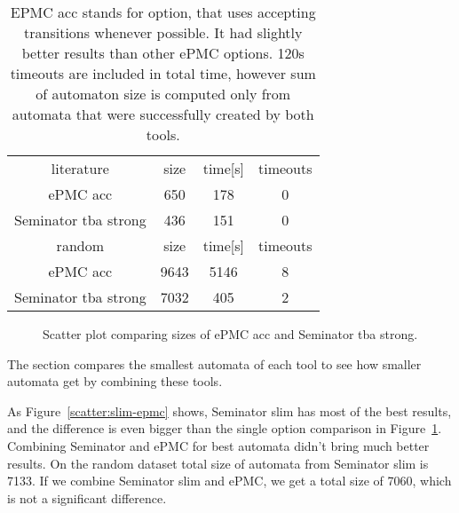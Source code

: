 \documentclass[
	digital,
nolof, nolot
]{fithesis3}
\newcommand{\hlineny}{\hline}
\begin{document}
	\begin{table}[ht]
		\centering
		
		\caption{EPMC acc stands for option, that uses accepting transitions whenever possible. It had slightly better results than other ePMC options. 120s timeouts are included in total time, however sum of automaton size is computed only from automata that were successfully created by both tools. }
		\label{table:epmc-seminator-1}
		\begin{tabular}{ |c||c|c|c| } 
			\hline
			literature&size&time[s]&timeouts\\
			\hhline{|====|}
			ePMC acc&650 &178&0 \\
			\hline
			Seminator tba strong &436 &151&0 \\
			\hlineny
			\hline
			random&size&time[s]&timeouts\\
			\hhline{|====|}
			ePMC acc&9643 & 5146&8\\
			\hline
			Seminator tba strong &7032 &405&2 \\
			\hlineny
		\end{tabular}
	\end{table}
	\begin{figure}[ht]
		\centering
		
		\caption{Scatter plot comparing sizes of ePMC acc and Seminator tba strong.}
		\label{scatter:slim-epmc-1}
		\begin{tikzpicture}
			
		\end{tikzpicture}
	\end{figure}
	
	
		The section compares the smallest automata of each tool to see how smaller automata get by combining these tools.
		
		As Figure~\ref{scatter:slim-epmc} shows, Seminator slim has most of the best results, and the difference is even bigger than the single option comparison in Figure~\ref{scatter:slim-epmc-1}. Combining Seminator and ePMC for best automata didn't bring much better results. On the random dataset total size of automata from Seminator slim is 7133. If we combine Seminator slim and ePMC, we get a total size of 7060, which is not a significant difference.
	
\end{document}
